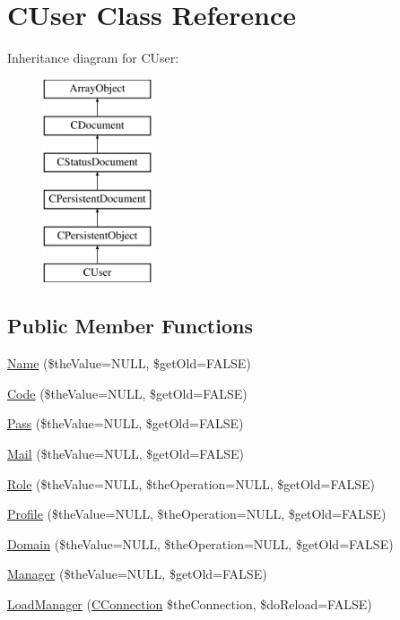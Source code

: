 \hypertarget{class_c_user}{\section{C\-User Class Reference}
\label{class_c_user}
}
Inheritance diagram for C\-User\-:\begin{figure}[H]
\begin{center}
\leavevmode
\includegraphics[height=6.000000cm]{class_c_user}
\end{center}
\end{figure}
\subsection*{Public Member Functions}
\begin{DoxyCompactItemize}
\item 
\hyperlink{class_c_user_ab645d29752c93c7c45f711e630691e51}{Name} (\$the\-Value=N\-U\-L\-L, \$get\-Old=F\-A\-L\-S\-E)
\item 
\hyperlink{class_c_user_a67e1a8d936265fbb8a10ccac4b76647a}{Code} (\$the\-Value=N\-U\-L\-L, \$get\-Old=F\-A\-L\-S\-E)
\item 
\hyperlink{class_c_user_a827f71914faf740df88212b8fa2f02a7}{Pass} (\$the\-Value=N\-U\-L\-L, \$get\-Old=F\-A\-L\-S\-E)
\item 
\hyperlink{class_c_user_ac17ab6a51035f9e8074c2602e47ae818}{Mail} (\$the\-Value=N\-U\-L\-L, \$get\-Old=F\-A\-L\-S\-E)
\item 
\hyperlink{class_c_user_add1faba1d336cf4b610a632d3c376dd2}{Role} (\$the\-Value=N\-U\-L\-L, \$the\-Operation=N\-U\-L\-L, \$get\-Old=F\-A\-L\-S\-E)
\item 
\hyperlink{class_c_user_ab0461ec04fd8043c24ec0ef94fadb995}{Profile} (\$the\-Value=N\-U\-L\-L, \$the\-Operation=N\-U\-L\-L, \$get\-Old=F\-A\-L\-S\-E)
\item 
\hyperlink{class_c_user_a09c0c6f7252ac4a3b96457b00ccc6901}{Domain} (\$the\-Value=N\-U\-L\-L, \$the\-Operation=N\-U\-L\-L, \$get\-Old=F\-A\-L\-S\-E)
\item 
\hyperlink{class_c_user_acd45e0c231f54e7ccc452cb6bcd3aa35}{Manager} (\$the\-Value=N\-U\-L\-L, \$get\-Old=F\-A\-L\-S\-E)
\item 
\hyperlink{class_c_user_a8059ecd785bdbb0ab52da79a46dcde6c}{Load\-Manager} (\hyperlink{class_c_connection}{C\-Connection} \$the\-Connection, \$do\-Reload=F\-A\-L\-S\-E)
\end{DoxyCompactItemize}
